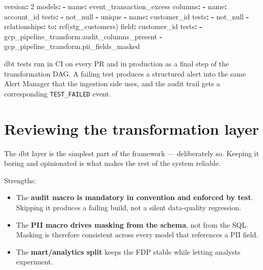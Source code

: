 \documentclass[
  11pt,
  british,
  oneside]{book}
\newenvironment{Shaded}{\begin{snugshade}}{\end{snugshade}}
\newcommand{\AttributeTok}[1]{\textcolor[rgb]{0.77,0.63,0.00}{#1}}
\newcommand{\DecValTok}[1]{\textcolor[rgb]{0.00,0.00,0.81}{#1}}
\newcommand{\FunctionTok}[1]{\textcolor[rgb]{0.00,0.00,0.00}{#1}}
\newcommand{\KeywordTok}[1]{\textcolor[rgb]{0.13,0.29,0.53}{\textbf{#1}}}
\providecommand{\tightlist}{%
  \setlength{\itemsep}{0pt}\setlength{\parskip}{0pt}}
\begin{document}
\begin{Shaded}
\begin{Highlighting}[]
\FunctionTok{version}\KeywordTok{:}\AttributeTok{ }\DecValTok{2}
\FunctionTok{models}\KeywordTok{:}
\AttributeTok{  }\KeywordTok{{-}}\AttributeTok{ }\FunctionTok{name}\KeywordTok{:}\AttributeTok{ event\_transaction\_excess}
\AttributeTok{    }\FunctionTok{columns}\KeywordTok{:}
\AttributeTok{      }\KeywordTok{{-}}\AttributeTok{ }\FunctionTok{name}\KeywordTok{:}\AttributeTok{ account\_id}
\AttributeTok{        }\FunctionTok{tests}\KeywordTok{:}
\AttributeTok{          }\KeywordTok{{-}}\AttributeTok{ not\_null}
\AttributeTok{          }\KeywordTok{{-}}\AttributeTok{ unique}
\AttributeTok{      }\KeywordTok{{-}}\AttributeTok{ }\FunctionTok{name}\KeywordTok{:}\AttributeTok{ customer\_id}
\AttributeTok{        }\FunctionTok{tests}\KeywordTok{:}
\AttributeTok{          }\KeywordTok{{-}}\AttributeTok{ not\_null}
\AttributeTok{          }\KeywordTok{{-}}\AttributeTok{ }\FunctionTok{relationships}\KeywordTok{:}
\AttributeTok{              }\FunctionTok{to}\KeywordTok{:}\AttributeTok{ ref(\textquotesingle{}stg\_customers\textquotesingle{})}
\AttributeTok{              }\FunctionTok{field}\KeywordTok{:}\AttributeTok{ customer\_id}
\AttributeTok{    }\FunctionTok{tests}\KeywordTok{:}
\AttributeTok{      }\KeywordTok{{-}}\AttributeTok{ gcp\_pipeline\_transform.audit\_columns\_present}
\AttributeTok{      }\KeywordTok{{-}}\AttributeTok{ gcp\_pipeline\_transform.pii\_fields\_masked}
\end{Highlighting}
\end{Shaded}

dbt tests run in CI on every PR and in production as a final step of the
transformation DAG. A failing test produces a structured alert into the
same Alert Manager that the ingestion side uses, and the audit trail
gets a corresponding \texttt{TEST\_FAILED} event.

\hypertarget{reviewing-the-transformation-layer}{%
\section{Reviewing the transformation
layer}\label{reviewing-the-transformation-layer}}

The dbt layer is the simplest part of the framework --- deliberately so.
Keeping it boring and opinionated is what makes the rest of the system
reliable.

Strengths:

\begin{itemize}
\tightlist
\item
  The \textbf{audit macro is mandatory in convention and enforced by
  test}. Skipping it produces a failing build, not a silent data-quality
  regression.
\item
  The \textbf{PII macro drives masking from the schema}, not from the
  SQL. Masking is therefore consistent across every model that
  references a PII field.
\item
  The \textbf{mart/analytics split} keeps the FDP stable while letting
  analysts experiment.
\end{itemize}
\end{document}
